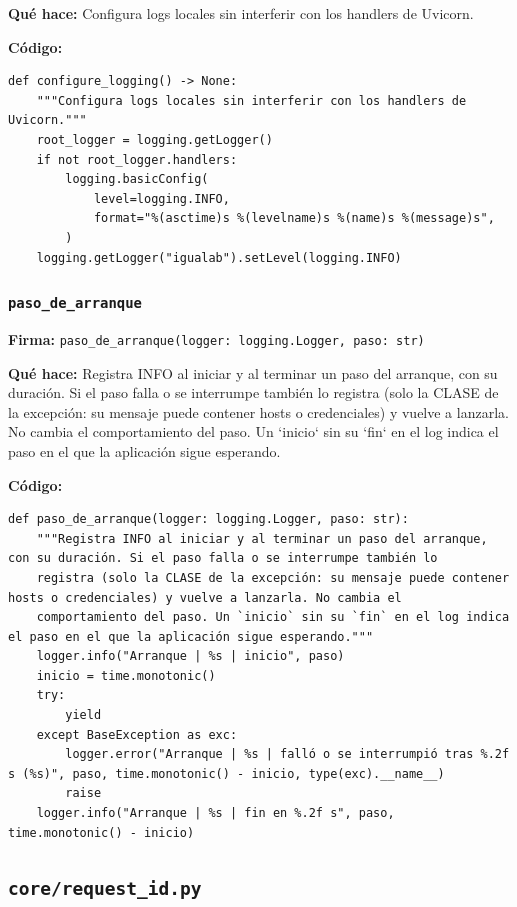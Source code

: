 \documentclass[11pt,a4paper]{article}
\begin{document}
\textbf{Qué hace:} Configura logs locales sin interferir con los handlers de Uvicorn.

\textbf{Código:}
\begin{lstlisting}
def configure_logging() -> None:
    """Configura logs locales sin interferir con los handlers de Uvicorn."""
    root_logger = logging.getLogger()
    if not root_logger.handlers:
        logging.basicConfig(
            level=logging.INFO,
            format="%(asctime)s %(levelname)s %(name)s %(message)s",
        )
    logging.getLogger("igualab").setLevel(logging.INFO)
\end{lstlisting}

\subsubsection*{\texttt{paso\_de\_arranque}}
\textbf{Firma:} \texttt{paso\_de\_arranque(logger: logging.Logger, paso: str)}

\textbf{Qué hace:} Registra INFO al iniciar y al terminar un paso del arranque, con su duración. Si el paso falla o se interrumpe también lo
registra (solo la CLASE de la excepción: su mensaje puede contener hosts o credenciales) y vuelve a lanzarla. No cambia el
comportamiento del paso. Un `inicio` sin su `fin` en el log indica el paso en el que la aplicación sigue esperando.

\textbf{Código:}
\begin{lstlisting}
def paso_de_arranque(logger: logging.Logger, paso: str):
    """Registra INFO al iniciar y al terminar un paso del arranque, con su duración. Si el paso falla o se interrumpe también lo
    registra (solo la CLASE de la excepción: su mensaje puede contener hosts o credenciales) y vuelve a lanzarla. No cambia el
    comportamiento del paso. Un `inicio` sin su `fin` en el log indica el paso en el que la aplicación sigue esperando."""
    logger.info("Arranque | %s | inicio", paso)
    inicio = time.monotonic()
    try:
        yield
    except BaseException as exc:
        logger.error("Arranque | %s | falló o se interrumpió tras %.2f s (%s)", paso, time.monotonic() - inicio, type(exc).__name__)
        raise
    logger.info("Arranque | %s | fin en %.2f s", paso, time.monotonic() - inicio)
\end{lstlisting}

\subsection{\texttt{core/request\_id.py}}
\end{document}

